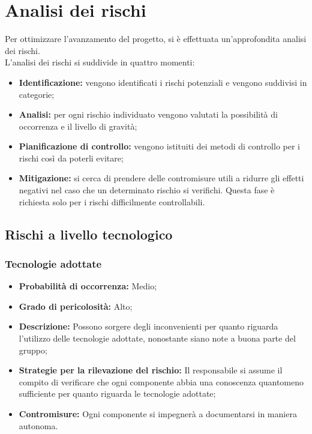 \section{Analisi dei rischi}
Per ottimizzare l'avanzamento del progetto, si è effettuata un'approfondita analisi dei
rischi. \\
L'analisi dei rischi si suddivide in quattro momenti:
\begin{itemize}
	\item \textbf{Identificazione:} vengono identificati i rischi potenziali e vengono suddivisi in categorie; \\
	\item \textbf{Analisi:} per ogni rischio individuato vengono valutati la possibilità di occorrenza e il livello di gravità; \\
	\item \textbf{Pianificazione di controllo:} vengono istituiti dei metodi di controllo per i rischi così da poterli evitare; \\
	\item \textbf{Mitigazione:} si cerca di prendere delle contromisure utili a ridurre gli effetti negativi nel caso che un determinato rischio si verifichi. Questa fase è richiesta solo per i rischi difficilmente controllabili. \\
\end{itemize}
	\subsection{Rischi a livello tecnologico}
		\subsubsection{Tecnologie adottate}
		\begin{itemize}
			\item \textbf{Probabilità di occorrenza:} Medio; \\
			\item \textbf{Grado di pericolosità:} Alto; \\
			\item \textbf{Descrizione:} Possono sorgere degli inconvenienti per quanto riguarda l'utilizzo delle tecnologie adottate, nonostante siano note a buona parte del gruppo; \\
			\item \textbf{Strategie per la rilevazione del rischio:} Il responsabile si assume il compito di verificare che ogni componente abbia una conoscenza quantomeno sufficiente per quanto riguarda le tecnologie adottate; \\
			\item \textbf{Contromisure:} Ogni componente si impegnerà a documentarsi in maniera autonoma. \\
		\end{itemize}
